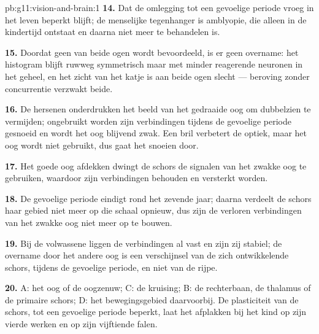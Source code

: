 \begin{solution}{pb:g11:vision-and-brain:1}
\textbf{14.} Dat de omlegging tot een gevoelige periode vroeg in het leven
beperkt blijft; de menselijke tegenhanger is amblyopie, die alleen in de
kindertijd ontstaat en daarna niet meer te behandelen is.

\textbf{15.} Doordat geen van beide ogen wordt bevoordeeld, is er geen
overname: het histogram blijft ruwweg symmetrisch maar met minder
reagerende neuronen in het geheel, en het zicht van het katje is aan beide
ogen slecht --- beroving zonder concurrentie verzwakt beide.

\textbf{16.} De hersenen onderdrukken het beeld van het gedraaide oog om
dubbelzien te vermijden; ongebruikt worden zijn verbindingen tijdens de
gevoelige periode gesnoeid en wordt het oog blijvend zwak. Een bril
verbetert de optiek, maar het oog wordt niet gebruikt, dus gaat het
snoeien door.

\textbf{17.} Het goede oog afdekken dwingt de schors de signalen van het
zwakke oog te gebruiken, waardoor zijn verbindingen behouden en versterkt
worden.

\textbf{18.} De gevoelige periode eindigt rond het zevende jaar; daarna
verdeelt de schors haar gebied niet meer op die schaal opnieuw, dus zijn
de verloren verbindingen van het zwakke oog niet meer op te bouwen.

\textbf{19.} Bij de volwassene liggen de verbindingen al vast en zijn zij
stabiel; de overname door het andere oog is een verschijnsel van de zich
ontwikkelende schors, tijdens de gevoelige periode, en niet van de rijpe.

\textbf{20.} A: het oog of de oogzenuw; C: de kruising; B: de rechterbaan,
de thalamus of de primaire schors; D: het bewegingsgebied daarvoorbij. De
plasticiteit van de schors, tot een gevoelige periode beperkt, laat het
afplakken bij het kind op zijn vierde werken en op zijn vijftiende falen.
\end{solution}
